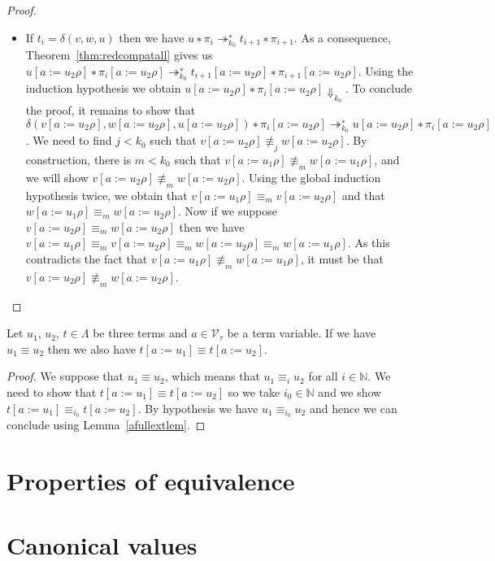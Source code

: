 \begin{proof}
\begin{itemize}
    \item If $t_i = δ(v,w,u)$ then we have ${u ∗ π_i} ↠_{k_0}^{∗} {t_{i+1} ∗
      π_{i+1}}$. As a consequence, Theorem~\ref{thm:redcompatall} gives us
      ${u[a := u_2ρ] ∗ π_i[a := u_2ρ]} ↠_{k_0}^{∗} {t_{i+1}[a := u_2ρ] ∗
      π_{i+1}[a := u_2ρ]}$. Using the induction hypothesis we obtain
      ${u[a := u_2ρ] ∗ π_i[a := u_2ρ]} {⇓}_{k_0}$. To conclude the proof, it
      remains to show that ${δ(v[a := u_2ρ],w[a := u_2ρ], u[a := u_2ρ]) ∗
      π_i[a := u_2ρ]} ↠_{k_0}^{∗} {u[a := u_2ρ] ∗ π_i[a := u_2ρ]}$.
      We need to find $j < k_0$ such that ${v[a := u_2ρ]} \not\equiv_j
      {w[a := u_2ρ]}$. By construction, there is $m < k_0$ such that
      ${v[a := u_1ρ]} \not\equiv_m {w[a := u_1ρ]}$, and we will show
      ${v[a := u_2ρ]} \not\equiv_m {w[a := u_2ρ]}$. Using the global
      induction hypothesis twice, we obtain that ${v[a := u_1ρ]} ≡_m
      {v[a := u_2ρ]}$ and that ${w[a := u_1ρ]} ≡_m {w[a := u_2ρ]}$.
      Now if we suppose ${v[a := u_2ρ]} ≡_m {w[a := u_2ρ]}$ then we
      have ${v[a := u_1ρ]} ≡_m {v[a := u_2ρ]} ≡_m {w[a := u_2ρ]} ≡_m
      {w[a := u_1ρ]}$. As this contradicts the fact that
      ${v[a := u_1ρ]} \not\equiv_m {w[a := u_1ρ]}$, it must be that
      ${v[a := u_2ρ]} \not\equiv_m {w[a := u_2ρ]}$.
  \end{itemize}
\end{proof}
\begin{theorem}\label{fullextterm}%
  Let $u_1$, $u_2$, $t ∈ Λ$ be three terms and $a ∈ \mathcal{V}_{τ}$ be a term
  variable. If we have $u_1 ≡ u_2$ then we also have
  ${t[a := u_1]} ≡ {t[a := u_2]}$.
\end{theorem}
\begin{proof}
  We suppose that $u_1 ≡ u_2$, which means that $u_1 ≡_i u_2$ for all
  $i ∈ \mathbb{N}$. We need to show that ${t[a := u_1]} ≡ {t[a := u_2]}$
  so we take $i_0 ∈ \mathbb{N}$ and we show ${t[a := u_1]} ≡_{i_0}
  {t[a := u_2]}$. By hypothesis we have $u_1 ≡_{i_0} u_2$ and hence we can
  conclude using Lemma~\ref{afullextlem}.
\end{proof}




\section{Properties of equivalence}


\section{Canonical values}

